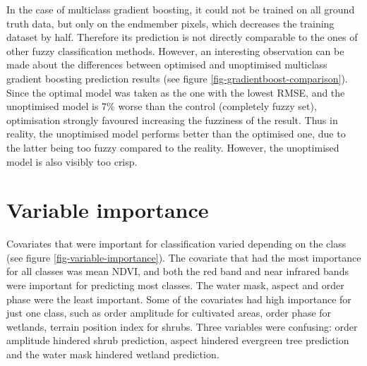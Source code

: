 \documentclass[a4paper,10pt]{book}
\begin{document}
In the case of multiclass gradient boosting, it could not be trained on all ground truth data, but only on the endmember pixels, which decreases the training dataset by half. Therefore its prediction is not directly comparable to the ones of other fuzzy classification methods. However, an interesting observation can be made about the differences between optimised and unoptimised multiclass gradient boosting prediction results (see figure \ref{fig-gradientboost-comparison}). Since the optimal model was taken as the one with the lowest RMSE, and the unoptimised model is 7\% worse than the control (completely fuzzy set), optimisation strongly favoured increasing the fuzziness of the result. Thus in reality, the unoptimised model performs better than the optimised one, due to the latter being too fuzzy compared to the reality. However, the unoptimised model is also visibly too crisp.

\section{Variable importance}

Covariates that were important for classification varied depending on the class (see figure \ref{fig-variable-importance}). The covariate that had the most importance for all classes was mean NDVI, and both the red band and near infrared bands were important for predicting most classes. The water mask, aspect and  order phase were the least important. Some of the covariates had high importance for just one class, such as  order amplitude for cultivated areas,  order phase for wetlands, terrain position index for shrubs. Three variables were confusing:  order amplitude hindered shrub prediction, aspect hindered evergreen tree prediction and the water mask hindered wetland prediction.
\end{document}
